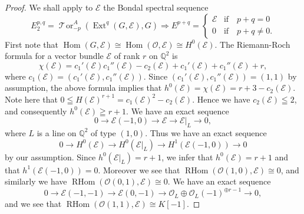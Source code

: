 \documentclass[a4paper,12pt]{amsart}
\DeclareMathOperator{\Hom}{Hom}
\DeclareMathOperator{\Ext}{Ext}
\DeclareMathOperator{\RHom}{RHom}
\newcommand{\caltor}{\mathop{{\mathcal T\!or}}\nolimits}
\begin{document}
\begin{proof}
We shall apply to $\mathcal{E}$ the Bondal spectral sequence \cite[Theorem 1]{MR3275418}
\[
E_2^{p,q}=\caltor_{-p}^A(\Ext^q(G,\mathcal{E}),G)
\Rightarrow
E^{p+q}=
\begin{cases}
\mathcal{E}& \textrm{if}\quad  p+q= 0\\
0& \textrm{if}\quad  p+q\neq 0.
\end{cases}
\]
First note that $\Hom(G,\mathcal{E})\cong \Hom(\mathcal{O},\mathcal{E})\cong H^0(\mathcal{E})$.
The Riemann-Roch formula for a vector bundle $\mathcal{E}$ of rank $r$ on $\mathbb{Q}^2$
is
\[\chi(\mathcal{E})=c_1'(\mathcal{E})c_1''(\mathcal{E})-c_2(\mathcal{E})+c_1'(\mathcal{E})+c_1''(\mathcal{E})+r,\]
where $c_1(\mathcal{E})=(c_1'(\mathcal{E}), c_1''(\mathcal{E}))$.
Since $(c_1'(\mathcal{E}), c_1''(\mathcal{E}))=(1,1)$ by assumption, the above formula implies 
that $h^0(\mathcal{E})=\chi(\mathcal{E})=r+3-c_2(\mathcal{E})$.
Note here that $0\leqq H(\mathcal{E})^{r+1}=c_1(\mathcal{E})^2-c_2(\mathcal{E})$.
Hence we have $c_2(\mathcal{E})\leqq 2$, 
and consequently $h^0(\mathcal{E})\geqq r+1$.
We have an exact sequence
\[
0\to \mathcal{E}(-1,0)\to \mathcal{E}\to \mathcal{E}|_L\to 0,
\]
where $L$ is a line on $\mathbb{Q}^2$ of type $(1,0)$.
Thus we have an exact sequence
\[0\to H^0(\mathcal{E})\to H^0(\mathcal{E}|_L)\to H^1(\mathcal{E}(-1,0))\to 0
\]
by our assumption. Since $h^0(\mathcal{E}|_L)=r+1$, we infer that $h^0(\mathcal{E})=r+1$
and that $h^1(\mathcal{E}(-1,0))=0$.
Moreover we see that $\RHom(\mathcal{O}(1,0),\mathcal{E})\cong 0$, and similarly
we have $\RHom(\mathcal{O}(0,1),\mathcal{E})\cong 0$.
We have an exact sequence
\[
0\to \mathcal{E}(-1,-1)\to \mathcal{E}(0,-1)\to \mathcal{O}_L\oplus \mathcal{O}_L(-1)^{\oplus r-1}\to 0,
\]
and we see that $\RHom(\mathcal{O}(1,1),\mathcal{E})\cong K[-1]$.


\end{proof}
\end{document}
